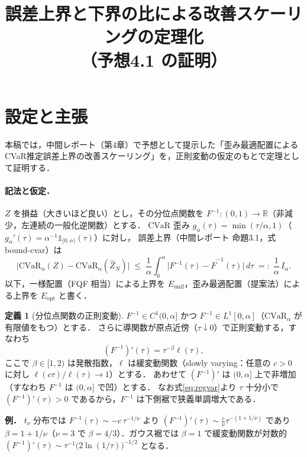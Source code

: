 \documentclass[a4paper,10pt]{jsarticle}
\title{誤差上界と下界の比による改善スケーリングの定理化\\（予想4.1 の証明）}
\author{}
\date{}
\theoremstyle{definition}
\newtheorem{definition}{定義}[section]
\newcommand{\CVaR}{\mathrm{CVaR}}
\newcommand{\Finv}{F^{-1}}
\newcommand{\Fhinv}{\hat{F}^{-1}}
\newcommand{\R}{\mathbb{R}}
\begin{document}
\maketitle

\section{設定と主張}

本稿では，中間レポート（第4章）で予想として提示した「歪み最適配置によるCVaR推定誤差上界の改善スケーリング」を，正則変動の仮定のもとで定理として証明する．

\paragraph{記法と仮定．}
$Z$ を損益（大きいほど良い）とし，その分位点関数を $\Finv\colon(0,1)\to\R$（非減少，左連続の一般化逆関数）とする．
$\CVaR$ 歪み $g_\alpha(\tau)=\min(\tau/\alpha,1)$（$g_\alpha'(\tau)=\alpha^{-1}\mathbb{1}_{[0,\alpha)}(\tau)$）に対し，
誤差上界（中間レポート 命題3.1，式 bound-cvar）は
\begin{equation}
  \bigl|\CVaR_\alpha(Z)-\CVaR_\alpha(\hat Z_N)\bigr|
  \;\le\;\frac1\alpha\int_0^\alpha\bigl|\Finv(\tau)-\Fhinv(\tau)\bigr|\,d\tau
  \;=:\;\frac1\alpha\,I_\alpha .
  \label{eq:bound-cvar2}
\end{equation}
以下，一様配置（FQF 相当）による上界を $E_{\mathrm{unif}}$，歪み最適配置（提案法）による上界を $E_{\mathrm{opt}}$ と書く．

\begin{definition}[分位点関数の正則変動]
\label{def:regvar}
$\Finv\in C^1(0,\alpha]$ かつ $\Finv\in L^1[0,\alpha]$（$\CVaR_\alpha$ が有限値をもつ）とする．
さらに導関数が原点近傍（$\tau\downarrow0$）で正則変動する，すなわち
\begin{equation}
  (\Finv)'(\tau)=\tau^{-\beta}\ell(\tau),
  \label{eq:regvar}
\end{equation}
ここで $\beta\in[1,2)$ は発散指数，$\ell$ は緩変動関数（slowly varying：任意の $c>0$ に対し $\ell(c\tau)/\ell(\tau)\to1$）とする．
あわせて $(\Finv)'$ は $(0,\alpha]$ 上で非増加（すなわち $\Finv$ は $(0,\alpha]$ で凹）とする．
なお式\eqref{eq:regvar}より $\tau$ 十分小で $(\Finv)'(\tau)>0$ であるから，$\Finv$ は下側裾で狭義単調増大である．
\end{definition}

\noindent
\textbf{例．} $t_\nu$ 分布では $\Finv(\tau)\sim-c\,\tau^{-1/\nu}$ より $(\Finv)'(\tau)\sim\frac{c}{\nu}\tau^{-(1+1/\nu)}$ であり $\beta=1+1/\nu$（$\nu=3$ で $\beta=4/3$）．ガウス裾では $\beta=1$ で緩変動関数が対数的 $(\Finv)'(\tau)\sim\tau^{-1}\bigl(2\ln(1/\tau)\bigr)^{-1/2}$ となる．
\end{document}
